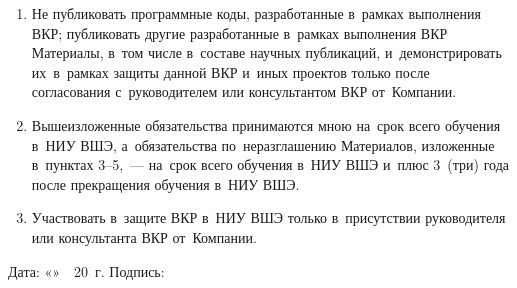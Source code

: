\documentclass[12pt,a4paper]{extarticle}
\begin{document}
\begin{enumerate}[leftmargin=1.4em, itemsep=5pt]
  \item Не публиковать программные коды, разработанные в~рамках выполнения ВКР;
        публиковать другие разработанные в~рамках выполнения ВКР Материалы, в~том
        числе в~составе научных публикаций, и~демонстрировать их~в~рамках защиты
        данной ВКР и~иных проектов только после согласования с~руководителем или
        консультантом ВКР от~Компании.

  \item Вышеизложенные обязательства принимаются мною на~срок всего обучения в~НИУ
        ВШЭ, а~обязательства по~неразглашению Материалов, изложенные в~пунктах
        3--5,~--- на~срок всего обучения в~НИУ ВШЭ и~плюс 3~(три) года после
        прекращения обучения в~НИУ ВШЭ.

  \item Участвовать в~защите ВКР в~НИУ ВШЭ только в~присутствии руководителя или
        консультанта ВКР от~Компании.
\end{enumerate}

\vspace{1.5em}

\noindent
Дата: «\underline{\hspace{1.2cm}}»~\underline{\hspace{3.5cm}}~20\underline{\hspace{0.6cm}}~г.
\hfill
Подпись: \underline{\hspace{4.5cm}}
\end{document}
